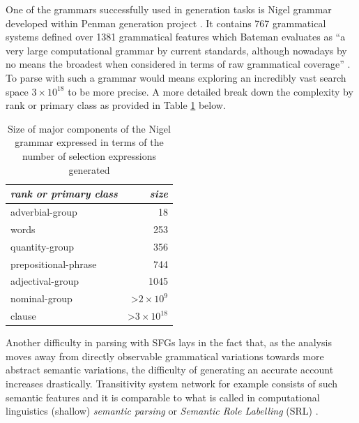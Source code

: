 One of the grammars successfully used in generation tasks is Nigel grammar developed within Penman generation project \citep{Mann83}. It contains 767 grammatical systems defined over 1381 grammatical features which Bateman evaluates as ``a very large computational grammar by current standards, although nowadays by no means the broadest when considered in terms of raw grammatical coverage'' \citep[29]{Bateman2008}. To parse with such a grammar would means exploring an incredibly vast search space $ 3 \times 10^{18} $ to be more precise. A more detailed break down the complexity by rank or primary class as provided in Table \ref{tab:size} below.

\begin{table}[!ht]
    \centering
    \begin{tabular}{|l|r|}
        \hline
        \textit{rank or primary class} & \textit{size}                             \\ \hline
        adverbial-group                & 18                                        \\ \hline
        words                          & 253                                       \\ \hline
        quantity-group                 & 356                                       \\ \hline
        prepositional-phrase           & 744                                       \\ \hline
        adjectival-group               & 1045                                      \\ \hline
        nominal-group                  & \textgreater $ 2\times 10^{9} $  \\ \hline
        clause                         & \textgreater $ 3\times 10^{18} $ \\ \hline
    \end{tabular}
    \caption{Size of major components of the Nigel grammar expressed in terms of the number of selection expressions generated \citep[35]{Bateman2008}}
    \label{tab:size}
\end{table}

Another difficulty in parsing with SFGs lays in the fact that, as the analysis moves away from directly observable grammatical variations towards more abstract semantic variations, the difficulty of generating an accurate account increases drastically. Transitivity system network for example consists of such semantic features and it is comparable to what is called in computational linguistics (shallow) \textit{semantic parsing} or \textit{Semantic Role Labelling} (SRL) \citep{Carreras2005}.

